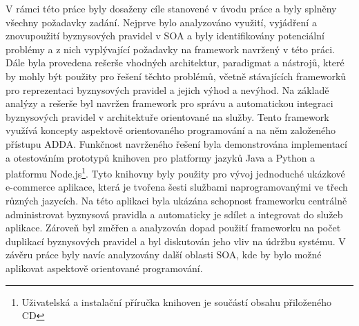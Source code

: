 V rámci této práce byly dosaženy cíle stanovené v úvodu práce a byly splněny všechny
požadavky zadání. Nejprve bylo analyzováno využití, vyjádření a znovupoužití
byznysových pravidel v \gls{SOA} a byly identifikovány potenciální problémy a z nich vyplývající požadavky
na framework navržený v této práci. Dále byla provedena rešerše vhodných architektur,
paradigmat a nástrojů, které by mohly být použity pro řešení těchto problémů, včetně stávajících
frameworků pro reprezentaci byznysových pravidel a jejich výhod a nevýhod. Na základě analýzy a
rešerše byl navržen framework pro správu a automatickou integraci byznysových pravidel
v architektuře orientované na služby. Tento framework využívá koncepty aspektově orientovaného programování
a na něm založeného přístupu \gls{ADDA}. Funkčnost navrženého řešení byla demonstrována implementací a
otestováním prototypů knihoven pro platformy jazyků Java a Python a platformu Node.js\footnote{Uživatelská
a instalační příručka knihoven je součástí obsahu přiloženého CD}. Tyto knihovny byly použity pro vývoj
jednoduché ukázkové e-commerce aplikace, která je tvořena šesti službami naprogramovanými
ve třech různých jazycích. Na této aplikaci byla ukázána schopnost frameworku centrálně administrovat byznysová
pravidla a automaticky je sdílet a integrovat do služeb aplikace. Zároveň byl změřen a analyzován
dopad použití frameworku na počet duplikací byznysových pravidel a byl diskutován jeho vliv na
údržbu systému. V závěru práce byly navíc analyzovány další oblasti \gls{SOA}, kde by bylo možné aplikovat
aspektově orientované programování.
